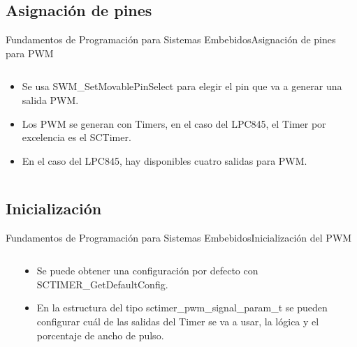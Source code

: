 \documentclass[aspectratio=169, xcolor=dvipsnames]{beamer}
\begin{document}
\subsection{Asignación de pines}
\begin{frame}{Fundamentos de Programación para Sistemas Embebidos}{Asignación de pines para PWM}
\begin{columns}
\begin{column}{0.5\textwidth}
\begin{itemize}
    \item Se usa \textcolor{myblue}{SWM\_SetMovablePinSelect} para elegir el pin que va a generar una salida PWM.
    \item Los PWM se generan con Timers, en el caso del LPC845, el Timer por excelencia es el SCTimer.
    \item En el caso del LPC845, hay disponibles cuatro salidas para PWM.
\end{itemize}
\end{column}
\begin{column}{0.5\textwidth}
  
\end{column}
\end{columns}
\end{frame}

\subsection{Inicialización}
\begin{frame}{Fundamentos de Programación para Sistemas Embebidos}{Inicialización del PWM}
\begin{columns}
\begin{column}{0.5\textwidth}

\end{column}
\begin{column}{0.5\textwidth}
\begin{itemize}
    \item Se puede obtener una configuración por defecto con \textcolor{myblue}{SCTIMER\_GetDefaultConfig}.
    \item En la estructura del tipo \textcolor{myblue}{sctimer\_pwm\_signal\_param\_t} se pueden configurar cuál de las salidas del Timer se va a usar, la lógica y el porcentaje de ancho de pulso.
\end{itemize}
\end{column}
\end{columns}
\end{frame}
\end{document}
